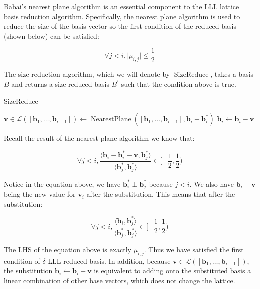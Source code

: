 Babai's nearest plane algorithm is an essential component to the LLL lattice basis reduction algorithm. Specifically, the nearest plane algorithm is used to reduce the size of the basis vector so the first condition of the reduced basis (shown below) can be satisfied:

$$
\forall j<i, \vert\mu_{i, j}\vert \leq \frac{1}{2}
$$

The size reduction algorithm, which we will denote by $\operatorname{SizeReduce}$, takes a basis $B$ and returns a size-reduced basis $B^\prime$ such that the condition above is true.

\begin{algorithm}
\caption{SizeReduce}
\begin{algorithmic}[1]
        \State $\mathbf{v} \in \mathcal{L}([\mathbf{b}_1, \ldots, \mathbf{b}_{i-1}]) \leftarrow \operatorname{NearestPlane}([\mathbf{b}_1, \ldots, \mathbf{b}_{i-1}], \mathbf{b}_i - \mathbf{b}_i^\ast)$
        \State $\mathbf{b}_i \leftarrow \mathbf{b}_i - \mathbf{v}$
    \EndFor
\end{algorithmic}
\end{algorithm}

Recall the result of the nearest plane algorithm we know that:

$$
\forall j < i,
\frac{
    \langle
        \mathbf{b}_i - \mathbf{b}_i^\ast - \mathbf{v}, \mathbf{b}_j^\ast
    \rangle
}{
    \langle 
        \mathbf{b}_j^\ast, \mathbf{b}_j^\ast
    \rangle
} \in [-\frac{1}{2}, \frac{1}{2})
$$

Notice in the equation above, we have $\mathbf{b}_i^\ast \perp \mathbf{b}_j^\ast$ because $j < i$. We also have $\mathbf{b}_i - \mathbf{v}$ being the new value for $\mathbf{v}_i$ after the substitution. This means that after the substitution:

$$
\forall j < i,
\frac{
    \langle
        \mathbf{b}_i, \mathbf{b}_j^\ast
    \rangle
}{
    \langle
        \mathbf{b}_j^\ast, \mathbf{b}_j^\ast
    \rangle
} \in [-\frac{1}{2}, \frac{1}{2})
$$

The LHS of the equation above is exactly $\mu_{i,j}$. Thus we have satisfied the first condition of $\delta$-LLL reduced basis. In addition, because $\mathbf{v} \in \mathcal{L}([\mathbf{b}_1, \ldots, \mathbf{b}_{i-1}])$, the substitution $\mathbf{b}_i \leftarrow \mathbf{b}_i - \mathbf{v}$ is equivalent to adding onto the substituted basis a linear combination of other base vectors, which does not change the lattice.

